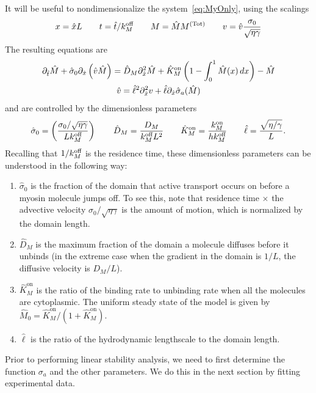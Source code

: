 \documentclass[11pt]{article}
\newcommand{\6}[1]{#1_{\text{6}}}
\newcommand{\3}[1]{#1_{\text{3}}}
\newcommand{\Tot}[1]{#1^\text{(Tot)}}
\newcommand{\My}[1]{#1_M}
\begin{document}
It will be useful to nondimensionalize the system\ \eqref{eq:MyOnly}, using the scalings
\begin{equation}
\label{eq:NDD}
x = \hat{x} L \qquad t= \hat{t}/\My{\koff} \qquad M= \hat{M}\Tot{M} \qquad v = \hat{v} \frac{\sigma_0}{\sqrt{\eta \gamma}}
\end{equation}
The resulting equations are 
\begin{subequations}
\label{eq:MyosinEqs}
\begin{gather}
\label{eq:MND}
\partial_{\hat{t}} \hat{M} +\hat{\sigma}_0  \partial_{\hat{x}} \left(\hat{v} \hat{M} \right) =\hat{D}_M \partial_{\hat{x}}^2 \hat{M} +\hat{K}^\text{on}_M \left(1-\int_0^1  \hat{M}(x) \, dx\right) - \hat{M}\\
\label{eq:MVND}
\hat{v} = \hat{\ell}^2 \partial_{\hat{x}}^2 v +\hat{\ell} \partial_{\hat{x}} \hat{\sigma}_a(\hat{M})
 \end{gather}
\end{subequations}
and are controlled by the dimensionless parameters
\begin{equation}
\label{eq:NDparams}
\hat{\sigma}_0 = \left(\frac{\sigma_0/ \sqrt{\eta \gamma} }{L \My{\koff}}\right)   \qquad \hat{D}_M =\frac{D_M}{\My{\koff}  L^2} \qquad \hat{K}^\text{on}_M= \frac{\My{\kon}}{h \My{\koff}} \qquad \hat{\ell} = \frac{\sqrt{\eta/\gamma}}{L}.
\end{equation}
Recalling that $1/\My{\koff}$ is the residence time, these dimensionless parameters can be understood in the following way: 
\begin{enumerate}
\item $\hat{\sigma}_0$ is the fraction of the domain that active transport occurs on before a myosin molecule jumps off. To see this, note that residence time $\times$ the advective velocity $\sigma_0 / \sqrt{\eta \gamma}$ is the amount of motion, which is normalized by the domain length.
\item $\hat{D}_M$ is the maximum fraction of the domain a molecule diffuses before it unbinds (in the extreme case when the gradient in the domain is $1/L$, the diffusive velocity is $D_M/L$). 
\item $\hat{K}^\text{on}_M$ is the ratio of the binding rate to unbinding rate when all the molecules are cytoplasmic. The uniform steady state of the model is given by $\hat{M}_0= \hat{K}^\text{on}_M/\left(1+\hat{K}^\text{on}_M\right)$.
\item $\hat{\ell}$ is the ratio of the hydrodynamic lengthscale to the domain length.
\end{enumerate}
Prior to performing linear stability analysis, we need to first determine the function $\sigma_a$ and the other parameters. We do this in the next section by fitting experimental data.
\end{document}
